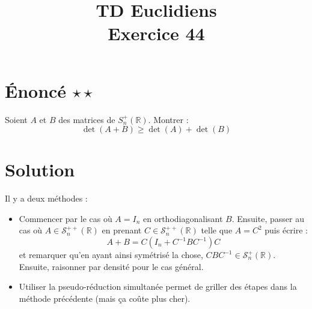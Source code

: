 \documentclass[french]{article}
\title{TD Euclidiens\\ Exercice 44}
\date{}
\newcommand{\R}{\mathbb{R}}
\newcommand{\inv}{^{-1}}
\begin{document}
\maketitle

\section{Énoncé $\star\star$}
Soient $A$ et $B$ des matrices de $S_n^+(\R)$. Montrer : $$\det(A+B)\geqslant \det(A)+\det(B)$$
\section{Solution}
Il y a deux méthodes :
\begin{itemize}
	\item Commencer par le cas où $A=I_n$ en orthodiagonalisant $B$. Ensuite, passer au cas où $A\in\mathcal{S}_n^{++}(\R)$ en prenant $C\in\mathcal{S}_n^{++}(\R)$ telle que $A=C^2$ puis écrire : $$A+B=C(I_n+C\inv BC\inv)C$$ et remarquer qu'en ayant ainsi symétrisé la chose, $CBC\inv\in\mathcal{S}_n^{+}(\R)$. Ensuite, raisonner par densité pour le cas général.
	\item Utiliser la pseudo-réduction simultanée permet de griller des étapes dans la méthode précédente (mais ça coûte plus cher).
\end{itemize}
\end{document}
